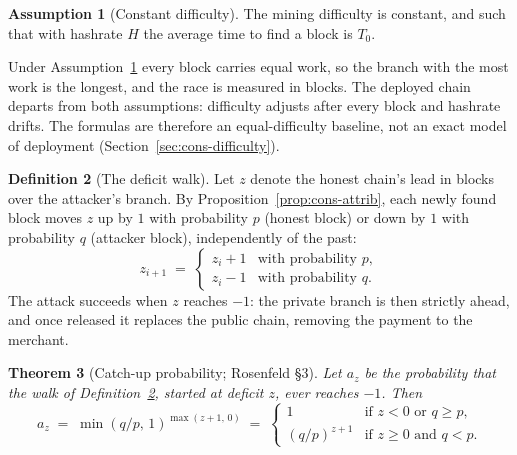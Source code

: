 \documentclass[11pt,a4paper]{article}
\newtheorem{theorem}{Theorem}[section]
\theoremstyle{definition}
\newtheorem{definition}[theorem]{Definition}
\newtheorem{assumption}[theorem]{Assumption}
\begin{document}
\begin{assumption}[Constant difficulty]\label{ass:cons-difficulty}
The mining difficulty is constant, and such that with hashrate $H$ the
average time to find a block is $T_0$.
\end{assumption}

Under Assumption~\ref{ass:cons-difficulty} every block carries equal
work, so the branch with the most work is the longest, and the race is
measured in blocks. The deployed chain departs from both assumptions:
difficulty adjusts after every block and hashrate drifts. The formulas
are therefore an equal-difficulty baseline, not an exact model of
deployment (Section~\ref{sec:cons-difficulty}).

\begin{definition}[The deficit walk]\label{def:cons-walk}
Let $z$ denote the honest chain's lead in blocks over the attacker's
branch. By Proposition~\ref{prop:cons-attrib}, each newly found block
moves $z$ up by $1$ with probability $p$ (honest block) or down by $1$
with probability $q$ (attacker block), independently of the past:
\[
  z_{i+1} \;=\;
  \begin{cases}
    z_i + 1 & \text{with probability } p,\\
    z_i - 1 & \text{with probability } q.
  \end{cases}
\]
The attack succeeds when $z$ reaches $-1$: the private branch is then
strictly ahead, and once released it replaces the public chain, removing
the payment to the merchant.
\end{definition}

\begin{theorem}[Catch-up probability; Rosenfeld \S3]\label{thm:cons-catchup}
Let $a_z$ be the probability that the walk of
Definition~\ref{def:cons-walk}, started at deficit $z$, ever reaches
$-1$. Then
\begin{equation}\label{eq:cons-az}
  a_z \;=\; \min(q/p,\, 1)^{\max(z+1,\,0)} \;=\;
  \begin{cases}
    1 & \text{if } z < 0 \text{ or } q \geq p,\\
    (q/p)^{z+1} & \text{if } z \geq 0 \text{ and } q < p.
  \end{cases}
\end{equation}
\end{theorem}
\end{document}
